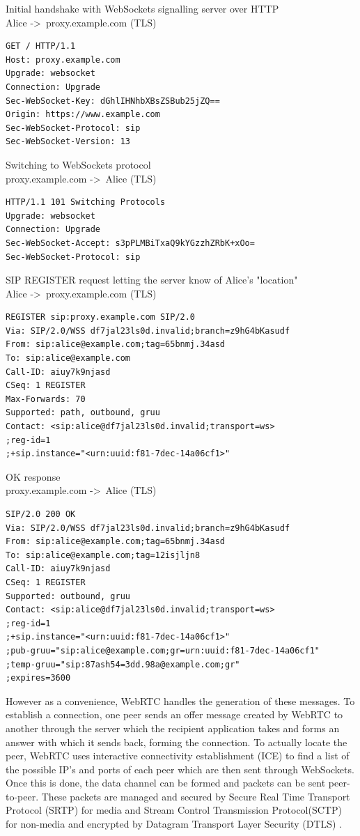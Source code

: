 \documentclass[]{report}
\begin{document}
Initial handshake with WebSockets signalling server over HTTP \\
Alice -\textgreater\ proxy.example.com (TLS)
\begin{lstlisting}[tabsize=1,frame=single, basicstyle=\ttfamily\footnotesize]
GET / HTTP/1.1
Host: proxy.example.com
Upgrade: websocket
Connection: Upgrade
Sec-WebSocket-Key: dGhlIHNhbXBsZSBub25jZQ==
Origin: https://www.example.com
Sec-WebSocket-Protocol: sip
Sec-WebSocket-Version: 13
\end{lstlisting}
Switching to WebSockets protocol \\
proxy.example.com -\textgreater\ Alice (TLS)
\begin{lstlisting}[tabsize=1,frame=single, basicstyle=\ttfamily\footnotesize]
HTTP/1.1 101 Switching Protocols
Upgrade: websocket
Connection: Upgrade
Sec-WebSocket-Accept: s3pPLMBiTxaQ9kYGzzhZRbK+xOo=
Sec-WebSocket-Protocol: sip
\end{lstlisting}
SIP REGISTER request letting the server know of Alice's "location" \\
Alice -\textgreater\ proxy.example.com (TLS)
\begin{lstlisting}[tabsize=1,frame=single, basicstyle=\ttfamily\footnotesize]
REGISTER sip:proxy.example.com SIP/2.0
Via: SIP/2.0/WSS df7jal23ls0d.invalid;branch=z9hG4bKasudf
From: sip:alice@example.com;tag=65bnmj.34asd
To: sip:alice@example.com
Call-ID: aiuy7k9njasd
CSeq: 1 REGISTER
Max-Forwards: 70
Supported: path, outbound, gruu
Contact: <sip:alice@df7jal23ls0d.invalid;transport=ws>
;reg-id=1
;+sip.instance="<urn:uuid:f81-7dec-14a06cf1>"
\end{lstlisting}
OK response \\
proxy.example.com -\textgreater\ Alice (TLS)
\begin{lstlisting}[tabsize=1,frame=single, basicstyle=\ttfamily\footnotesize]
SIP/2.0 200 OK
Via: SIP/2.0/WSS df7jal23ls0d.invalid;branch=z9hG4bKasudf
From: sip:alice@example.com;tag=65bnmj.34asd
To: sip:alice@example.com;tag=12isjljn8
Call-ID: aiuy7k9njasd
CSeq: 1 REGISTER
Supported: outbound, gruu
Contact: <sip:alice@df7jal23ls0d.invalid;transport=ws>
;reg-id=1
;+sip.instance="<urn:uuid:f81-7dec-14a06cf1>"
;pub-gruu="sip:alice@example.com;gr=urn:uuid:f81-7dec-14a06cf1"
;temp-gruu="sip:87ash54=3dd.98a@example.com;gr"
;expires=3600
\end{lstlisting}

	However as a convenience, WebRTC handles the generation of these messages. To establish a connection, one peer sends an offer message created by WebRTC to another through the server which the recipient application takes and forms an answer with which it sends back, forming the connection. To actually locate the peer, WebRTC uses interactive connectivity establishment (ICE) to find a list of the possible IP's and ports of each peer which are then sent through WebSockets. Once this is done, the data channel can be formed and packets can be sent peer-to-peer. These packets are managed and secured by Secure Real Time Transport Protocol (SRTP) for media and Stream Control Transmission Protocol(SCTP) for non-media and encrypted by Datagram Transport Layer Security (DTLS) \cite{WebRTC Data Channel Establishment Protocol}.
				
\end{document}
